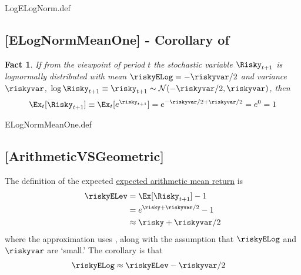 \message{ !name(MathFactsList.tex)}\documentclass{handout}
\newtheorem{Fact}{Fact}
\begin{document}
\begin{verbatimwrite}{LogELogNorm.def}
\providecommand{\LogELogNorm}{\href{https://www.econ2.jhu.edu/people/ccarroll/public/LectureNotes/MathFacts/MathFactsList\#LogELogNorm}{\ensuremath{\mathtt{[LogELogNorm]}}}}
\end{verbatimwrite}

\hypertarget{ELogNormMeanOne}{}
\subsection{[ELogNormMeanOne] - Corollary of \ELogNorm}

\begin{Fact} If from the viewpoint of period $t$ the stochastic variable $\Risky_{t+1}$ is lognormally distributed with mean $\riskyELog=-\riskyvar/2$ and variance $\riskyvar$, $\log \Risky_{t+1} \equiv \risky_{t+1} \sim \mathcal{N}(-\riskyvar/2,\riskyvar)$, then 
\begin{equation}
        \Ex_{t}[\Risky_{t+1}] \equiv \Ex_{t}[e^{\risky_{t+1}}] = e^{-\riskyvar/2+\riskyvar/2}=e^{0}=1 \label{eq:ELogNormMeanOne}
\end{equation}
\end{Fact}

\begin{verbatimwrite}{ELogNormMeanOne.def}
\providecommand{\ELogNormMeanOne}{\href{https://www.econ2.jhu.edu/people/ccarroll/public/LectureNotes/MathFacts/MathFactsList\#ELogNormMeanOne}{\ensuremath{\mathtt{[ELogNormMeanOne]}}}}
\end{verbatimwrite}

\hypertarget{ArithmeticVSGeometric}{}
\subsection{[ArithmeticVSGeometric]}

The definition of the expected \href{https://stats.stackexchange.com/questions/30365/why-is-expectation-the-same-as-the-arithmetic-mean}{expected arithmetic mean return} is 
\begin{equation}\begin{gathered}\begin{aligned} \label{eq:riskyELev}
      \riskyELev & = \Ex[\Risky_{t+1}]-1
\\ & = e^{\null{\risky}+\riskyvar/2} - 1
  \\ & \approx \risky+\riskyvar/2
    \end{aligned}\end{gathered}\end{equation}
where the approximation uses \ExpEps, along with the assumption that $\riskyELog$ and $\riskyvar$ are `small.'  The corollary is that 
\begin{equation}\begin{gathered}\begin{aligned} \label{eq:riskyELog}
 \riskyELog & \approx \riskyELev-\riskyvar/2 
\end{aligned}\end{gathered}\end{equation}
\end{document}
